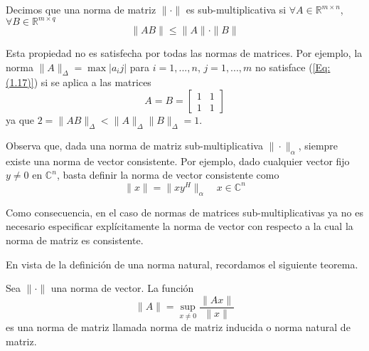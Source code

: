 \begin{definition}
    Decimos que una norma de matriz $\| \cdot \|$ es sub-multiplicativa si $\forall A \in \mathbb{R}^{m \times n}$, $\forall B \in \mathbb{R}^{m \times q}$
    \begin{equation}
        \| A B\| \leq \|A\| \cdot \|B\|
        \label{Eq: (1.17)}
    \end{equation}
\end{definition}

Esta propiedad no es satisfecha por todas las normas de matrices. Por ejemplo, la norma $ \|A\|_\Delta = \max{|a_ij|}$ para $i = 1, ..., n$, $j = 1, ..., m$ no satisface (\ref{Eq: (1.17)}) si se aplica a las matrices
\[ A = B = \begin{bmatrix}
    1 & 1 \\
    1 & 1
\end{bmatrix} \]
ya que $2 = \|AB\|_\Delta < \|A\|_\Delta \|B\|_\Delta = 1$.

Observa que, dada una norma de matriz sub-multiplicativa $\|\cdot\|_\alpha$, siempre existe una norma de vector consistente. Por ejemplo, dado cualquier vector fijo $y \neq 0$ en $\mathbb{C}^n$, basta definir la norma de vector consistente como
\[ \|x\| = \| x y^H \|_\alpha \quad x \in \mathbb{C}^n\]

Como consecuencia, en el caso de normas de matrices sub-multiplicativas ya no es necesario especificar explícitamente la norma de vector con respecto a la cual la norma de matriz es consistente.

En vista de la definición de una norma natural, recordamos el siguiente teorema.

\begin{theorem}
    Sea $\| \cdot \|$ una norma de vector. La función
    \begin{equation}
        \| A \| = \sup_{x \neq 0}{\frac{\| Ax \|}{\|x\|}}
        \label{Eq: (1.19)}
    \end{equation}
    es una norma de matriz llamada norma de matriz inducida o norma natural de matriz.
    \label{Theorem: 1.1}
\end{theorem}

